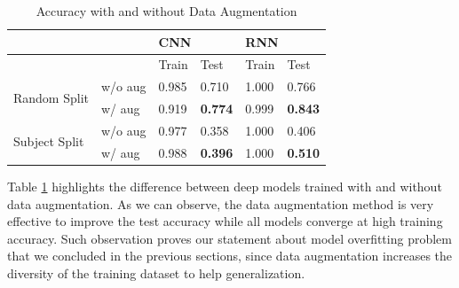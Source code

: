 \documentclass{article}
\begin{document}
\begin{multicols*}{2}
\begin{table}[H]
\centering
\begin{tabular}{llllll}
                               &                  & \multicolumn{2}{l}{CNN} & \multicolumn{2}{l}{RNN} \\ \hline
                               &                  & Train      & Test       & Train      & Test       \\ \hline
\multirow{2}{*}{Random Split}  & w/o aug & 0.985      & 0.710      & 1.000      & 0.766      \\ 
                               & w/ aug  & 0.919      & \textbf{0.774}      & 0.999      & \textbf{0.843}      \\ \hline
\multirow{2}{*}{Subject Split} & w/o aug & 0.977      & 0.358      & 1.000      & 0.406      \\  
                               & w/ aug  & 0.988      & \textbf{0.396}      & 1.000      & \textbf{0.510}      \\ \hline
\end{tabular}
\vspace{3pt}
\caption{Accuracy with and without Data Augmentation}
\label{tab:data-aug-acc}
\end{table}

\vspace{-15px}
Table \ref{tab:data-aug-acc} highlights the difference between deep models trained with and without data augmentation. As we can observe, the data augmentation method is very effective to improve the test accuracy while all models converge at high training accuracy. Such observation proves our statement about model overfitting problem that we concluded in the previous sections, since data augmentation increases the diversity of the training dataset to help generalization.



\end{multicols*}
\end{document}
